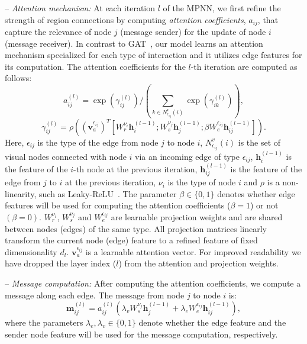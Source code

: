\documentclass[runningheads]{llncs}
\newcommand{\h}{\mathbf{h}}
\newcommand{\mysubparagraph}[1]{\smallskip\noindent-- \emph{#1:}}
\begin{document}
\mysubparagraph{Attention mechanism} At each iteration $l$ of the 
MPNN, we first refine the strength of region connections by computing \emph{attention 
coefficients}, $a_{ij}$, that capture the relevance of node $j$ (message sender) for the update 
of node $i$ (message receiver). In contrast to GAT~\cite{Velickovic:ICLR18}, our model learns an attention mechanism specialized for each type of interaction and it utilizes edge features for its computation.
The attention coefficients for the $l$-th iteration are computed as follows:
\begin{equation}
a_{ij}^{(l)} = \exp{\left(\gamma^{(l)}_{ij}\right)} / \left( \sum_{k \in N^v_{\epsilon_{ij}}(i)} \exp{\left(\gamma^{(l)}_{ik}\right)} \right) ,
\end{equation}
\begin{equation}
\gamma^{(l)}_{ij} = \rho \left(  \left({\mathbf{v}_a ^{\epsilon_{ij}} }\right) ^ { T } \left[ W_r^{\nu_i} \h _ { i }^{(l-1)} ; W_s^{\nu_j}  \h _ { j }^{(l-1)} ; \beta W_{e}^{\epsilon_{ij}} \h _ { ij }^{(l-1)} \right] \right) .
\label{eq:attention}
\end{equation}
Here, $\epsilon_{ij}$ is the type of the 
edge from node $j$ to node $i$, $N^v_{\epsilon_{ij}}(i)$ is the set of visual nodes connected with node $i$ via an incoming edge of type $\epsilon_{ij}$,
$\h_{i}^{(l-1)}$ is the feature of the $i$-th node at the previous iteration,
$\h_{ ij }^{(l-1)}$ is the feature of the edge from $j$ to $i$ at the previous iteration, $\nu_i$ is the type of node $i$ and $\rho$ is a non-linearity, such as Leaky-ReLU~\cite{He:ICCV15}. The parameter $\beta \in \{0,1\}$ denotes whether edge features will be used for computing the attention coefficients ($\beta=1$) or not $(\beta=0)$.
$W_{r}^{\nu_i}$, $W_{s}^{\nu_j}$ and  $W_{e}^{\epsilon_{ij}}$ are 
learnable projection weights and are shared between nodes (edges) of the same type. All projection matrices linearly transform the current node 
(edge) feature to a refined feature of fixed dimensionality $d_l$. $
\mathbf{v}_a ^{\epsilon_{ij}}$ is a learnable attention vector.
For improved 
readability we have dropped the layer index ($l$) from the attention and 
projection weights.

\mysubparagraph{Message computation} After computing the attention coefficients, we compute a message along each edge. The message from node $j$ to node $i$ is:
\begin{equation}
\mathbf{m}^{(l)}_{ij} = a_{ij}^{(l)} \left(\lambda_v W_s^{\nu_j} \h _ { j }^{(l-1)} + \lambda_e  W_{e}^{\epsilon_{ij}}  \h _ { ij }^{(l-1)} \right),
\label{eq:message_across_edge}
\end{equation}
where the parameters $\lambda_e,\lambda_v\in\{0,1\}$ denote whether the edge feature and the sender node feature will be used for the message computation, respectively. 
\end{document}
